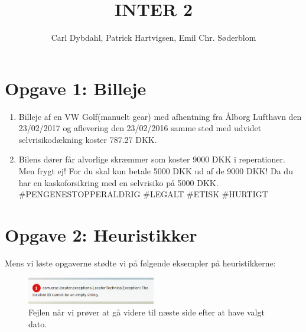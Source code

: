 \documentclass[a4paper]{article}
\title{INTER 2}
\author{Carl Dybdahl, Patrick Hartvigsen, Emil Chr. Søderblom}
\begin{document}
\maketitle

\section*{Opgave 1: Billeje}
\begin{enumerate}
\item Billeje af en VW Golf(manuelt gear) med afhentning fra Ålborg Lufthavn den 23/02/2017 og aflevering den 23/02/2016 samme sted med udvidet selvrisikodækning koster 787.27 DKK.
\item Bilens dører får alvorlige skræmmer som koster 9000 DKK i reperationer. Men frygt ej! For du skal kun betale 5000 DKK ud af de 9000 DKK! Da du har en kaskoforsikring med en selvrisiko på 5000 DKK. \#PENGENESTOPPERALDRIG \#LEGALT \#ETISK \#HURTIGT
\end{enumerate}

\section*{Opgave 2: Heuristikker}

Mens vi løste opgaverne stødte vi på følgende eksempler på heuristikkerne:

\begin{figure}[!ht]
\centering
\includegraphics[width=0.5\textwidth]{error0.png}
\caption{Fejlen når vi prøver at gå videre til næste side efter at have valgt dato.}
\label{error-next}
\end{figure}
\end{document}
